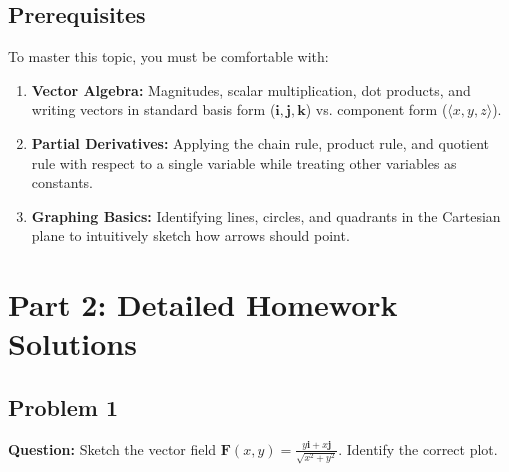 \documentclass[11pt]{article}
\begin{document}
\subsection{Prerequisites}
To master this topic, you must be comfortable with:
\begin{enumerate}
    \item \textbf{Vector Algebra:} Magnitudes, scalar multiplication, dot products, and writing vectors in standard basis form ($\mathbf{i}, \mathbf{j}, \mathbf{k}$) vs. component form ($\langle x, y, z \rangle$).
    \item \textbf{Partial Derivatives:} Applying the chain rule, product rule, and quotient rule with respect to a single variable while treating other variables as constants.
    \item \textbf{Graphing Basics:} Identifying lines, circles, and quadrants in the Cartesian plane to intuitively sketch how arrows should point.
\end{enumerate}

\section{Part 2: Detailed Homework Solutions}

\subsection*{Problem 1}
\textbf{Question:} Sketch the vector field $\mathbf{F}(x, y) = \frac{y\mathbf{i} + x\mathbf{j}}{\sqrt{x^2 + y^2}}$. Identify the correct plot.
\end{document}
